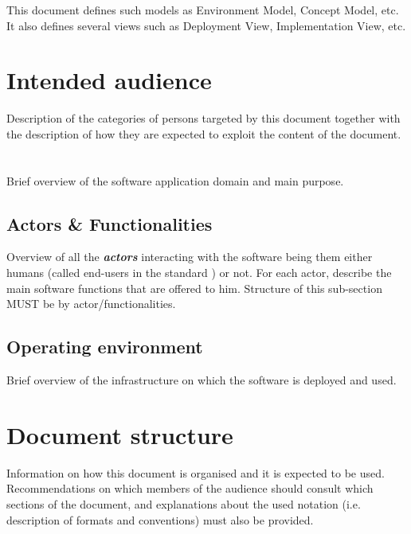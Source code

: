 This document defines such models as \gls{Environment
Model}, \gls{Concept Model}, etc. It also defines several views such as
\gls{Deployment View}, \gls{Implementation View}, etc.



\section{Intended audience}
Description of the categories of persons targeted by this document together with the description of how they are expected to exploit the content of the document.


\section{\mysystemname}
Brief overview of the software application domain and main purpose.


\subsection{Actors \& Functionalities}
Overview of all the \textbf{\emph{\glspl{actor}}} interacting with the software
being them either humans (called end-users in the standard
\cite{IEEE-2001-userdocumentation}) or not. For each actor, describe the main
software functions that are offered to him. Structure of this sub-section MUST
be by actor/functionalities.


\subsection{Operating environment}
Brief overview of the infrastructure on which the software is deployed and used.

\section{Document structure}  
Information on how this document is organised and it is expected to be
used. Recommendations on which members of the audience
should consult which sections of the document, and explanations about the used
notation (i.e. description of formats and conventions) must also be provided.





